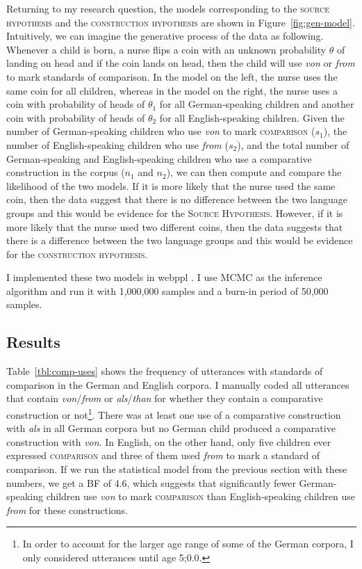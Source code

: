 \documentclass[lucida]{sp} %
\begin{document}
Returning to my research question, the models corresponding to the \textsc{source hypothesis} and the  \textsc{construction hypothesis} are shown in Figure~\ref{fig:gen-model}. Intuitively, we can imagine the generative process of the data as following. Whenever a child is born, a nurse flips a coin with an unknown probability $\theta$ of landing on head and if the coin lands on head, then the child will use \textit{von} or \textit{from} to mark standards of comparison. In the model on the left, the nurse uses the same coin for all children, whereas in the model on the right, the nurse uses a coin with probability of heads of $\theta_1$ for all German-speaking children and another coin with probability of heads of $\theta_2$ for all English-speaking children. Given the number of German-speaking children who use \textit{von} to mark \textsc{comparison} ($s_1$), the number of English-speaking children who use \textit{from} ($s_2$), and the total number of German-speaking and English-speaking children who use a comparative construction in the corpus ($n_1$ and $n_2$), we can then compute and compare the likelihood of the two models. If it is more likely that the nurse used the same coin, then the data suggest that there is no difference between the two language groups and this would be evidence for the \textsc{Source Hypothesis}. However, if it is more likely that the nurse used two different coins, then the data suggests that there is a difference between the two language groups and this would be evidence for the \textsc{construction hypothesis}.

I implemented these two models in webppl \citep{goodman2014}. I use MCMC as the inference algorithm
and run it with 1,000,000 samples and a burn-in period of 50,000 samples.

\subsection{Results}

Table~\ref{tbl:comp-uses} shows the frequency of utterances with standards of comparison in the German and English corpora. I manually coded all utterances that contain \textit{von}/\textit{from} or \textit{als}/\textit{than} for whether they contain a comparative construction or not\footnote{In order to account for the larger age range of some of the German corpora, I only considered utterances until age 5;0.0.}. There was at least one use of a comparative construction with \textit{als} in all German corpora but no German child produced a comparative construction with \textit{von}. In English, on the other hand, only five children ever expressed \textsc{comparison} and three of them used \textit{from} to mark a standard of comparison. If we run the statistical model from the previous section with these numbers, we get a BF of 4.6, which suggests that significantly fewer German-speaking children use \textit{von} to mark \textsc{comparison} than English-speaking children use \textit{from} for these constructions. 
\end{document}
